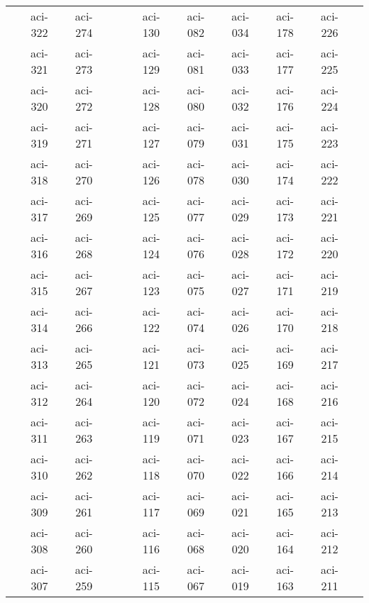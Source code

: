 \documentclass[10pt,letterpaper]{article}
\begin{document}
\begin{center}
\begin{tabular}{ |c|c|c|c|c|c|c|c|c|c|c|}
        & aci-322 & aci-274 &                &               & aci-130 & aci-082 & aci-034 & aci-178 & aci-226 &         \\
        & aci-321 & aci-273 &                &               & aci-129 & aci-081 & aci-033 & aci-177 & aci-225 &         \\
        & aci-320 & aci-272 &                &               & aci-128 & aci-080 & aci-032 & aci-176 & aci-224 &         \\
        & aci-319 & aci-271 &                &               & aci-127 & aci-079 & aci-031 & aci-175 & aci-223 &         \\
        & aci-318 & aci-270 &                &               & aci-126 & aci-078 & aci-030 & aci-174 & aci-222 &         \\
        & aci-317 & aci-269 &                &               & aci-125 & aci-077 & aci-029 & aci-173 & aci-221 &         \\
        & aci-316 & aci-268 &                &               & aci-124 & aci-076 & aci-028 & aci-172 & aci-220 &         \\
        & aci-315 & aci-267 &                &               & aci-123 & aci-075 & aci-027 & aci-171 & aci-219 &         \\
        & aci-314 & aci-266 &                &               & aci-122 & aci-074 & aci-026 & aci-170 & aci-218 &         \\
        & aci-313 & aci-265 &                &               & aci-121 & aci-073 & aci-025 & aci-169 & aci-217 &         \\
        & aci-312 & aci-264 &                &               & aci-120 & aci-072 & aci-024 & aci-168 & aci-216 &         \\
        & aci-311 & aci-263 &                &               & aci-119 & aci-071 & aci-023 & aci-167 & aci-215 &         \\
        & aci-310 & aci-262 &                &               & aci-118 & aci-070 & aci-022 & aci-166 & aci-214 &         \\
        & aci-309 & aci-261 &                &               & aci-117 & aci-069 & aci-021 & aci-165 & aci-213 &         \\
        & aci-308 & aci-260 &                &               & aci-116 & aci-068 & aci-020 & aci-164 & aci-212 &         \\
        & aci-307 & aci-259 &                &               & aci-115 & aci-067 & aci-019 & aci-163 & aci-211 &         \\

\end{tabular}
\end{center}
\end{document}
